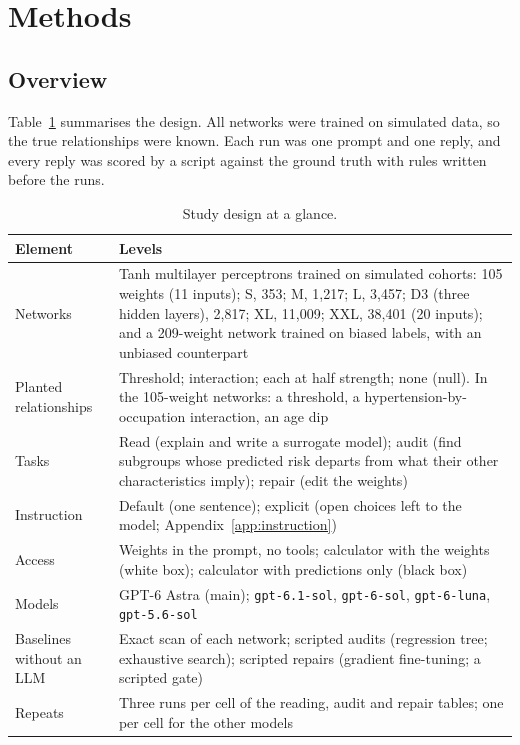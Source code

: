 \documentclass[11pt]{article}
\newcommand{\astra}{GPT-6 Astra}
\begin{document}
\section{Methods}

\subsection{Overview}

Table~\ref{tab:design} summarises the design. All networks were trained on simulated data, so the true relationships were known. Each run was one prompt and one reply, and every reply was scored by a script against the ground truth with rules written before the runs.

\begin{table}[t]
\centering
\caption{Study design at a glance.}
\label{tab:design}
\small
\begin{tabularx}{\textwidth}{@{}lX@{}}
\toprule
Element & Levels \\
\midrule
Networks & Tanh multilayer perceptrons trained on simulated cohorts: 105 weights (11 inputs); S, 353; M, 1,217; L, 3,457; D3 (three hidden layers), 2,817; XL, 11,009; XXL, 38,401 (20 inputs); and a 209-weight network trained on biased labels, with an unbiased counterpart \\
Planted relationships & Threshold; interaction; each at half strength; none (null). In the 105-weight networks: a threshold, a hypertension-by-occupation interaction, an age dip \\
Tasks & Read (explain and write a surrogate model); audit (find subgroups whose predicted risk departs from what their other characteristics imply); repair (edit the weights) \\
Instruction & Default (one sentence); explicit (open choices left to the model; Appendix~\ref{app:instruction}) \\
Access & Weights in the prompt, no tools; calculator with the weights (white box); calculator with predictions only (black box) \\
Models & \astra{} (main); \texttt{gpt-6.1-sol}, \texttt{gpt-6-sol}, \texttt{gpt-6-luna}, \texttt{gpt-5.6-sol} \\
Baselines without an LLM & Exact scan of each network; scripted audits (regression tree; exhaustive search); scripted repairs (gradient fine-tuning; a scripted gate) \\
Repeats & Three runs per cell of the reading, audit and repair tables; one per cell for the other models \\
\bottomrule
\end{tabularx}
\end{table}
\end{document}
